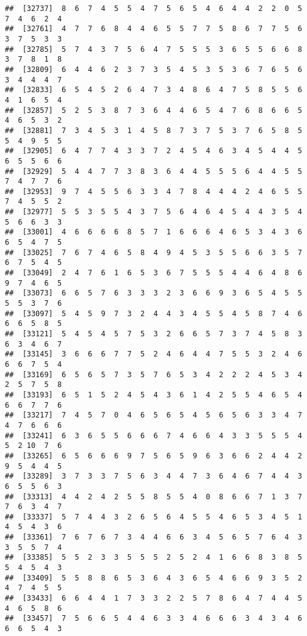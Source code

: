 \documentclass[
]{book}
\begin{document}
\begin{verbatim}
##  [32737]  8  6  7  4  5  5  4  7  5  6  5  4  6  4  4  2  2  0  5  7  4  6  2  4
##  [32761]  4  7  7  6  8  4  4  6  5  5  7  7  5  8  6  7  7  5  6  3  7  5  3  3
##  [32785]  5  7  4  3  7  5  6  4  7  5  5  5  3  6  5  5  6  6  8  3  7  8  1  8
##  [32809]  6  4  4  6  2  3  7  3  5  4  5  3  5  3  6  7  6  5  6  3  4  4  4  7
##  [32833]  6  5  4  5  2  6  4  7  3  4  8  6  4  7  5  8  5  5  6  4  1  6  5  4
##  [32857]  5  2  5  3  8  7  3  6  4  4  6  5  4  7  6  8  6  6  5  4  6  5  3  2
##  [32881]  7  3  4  5  3  1  4  5  8  7  3  7  5  3  7  6  5  8  5  5  4  9  5  5
##  [32905]  6  4  7  7  4  3  3  7  2  4  5  4  6  3  4  5  4  4  5  6  5  5  6  6
##  [32929]  5  4  4  7  7  3  8  3  6  4  4  5  5  5  6  4  4  5  5  7  4  7  7  6
##  [32953]  9  7  4  5  5  6  3  3  4  7  8  4  4  4  2  4  6  5  5  7  4  5  5  2
##  [32977]  5  5  3  5  5  4  3  7  5  6  4  6  4  5  4  4  3  5  4  5  6  6  3  3
##  [33001]  4  6  6  6  6  8  5  7  1  6  6  6  4  6  5  3  4  3  6  6  5  4  7  5
##  [33025]  7  6  7  4  6  5  8  4  9  4  5  3  5  5  6  6  3  5  7  6  7  5  4  5
##  [33049]  2  4  7  6  1  6  5  3  6  7  5  5  5  4  4  6  4  8  6  9  7  4  6  5
##  [33073]  6  6  5  7  6  3  3  3  2  3  6  6  9  3  6  5  4  5  5  5  5  3  7  6
##  [33097]  5  4  5  9  7  3  2  4  4  3  4  5  5  4  5  8  7  4  6  6  6  5  8  5
##  [33121]  5  4  5  4  5  7  5  3  2  6  6  5  7  3  7  4  5  8  3  6  3  4  6  7
##  [33145]  3  6  6  6  7  7  5  2  4  6  4  4  7  5  5  3  2  4  6  6  6  7  5  4
##  [33169]  6  5  6  5  7  3  5  7  6  5  3  4  2  2  2  4  5  3  4  2  5  7  5  8
##  [33193]  6  5  1  5  2  4  5  4  3  6  1  4  2  5  5  4  6  5  4  6  6  7  7  6
##  [33217]  7  4  5  7  0  4  6  5  6  5  4  5  6  5  6  3  3  4  7  4  7  6  6  6
##  [33241]  6  3  6  5  5  6  6  6  7  4  6  6  4  3  3  5  5  5  4  5  2 10  7  6
##  [33265]  6  5  6  6  6  9  7  5  6  5  9  6  3  6  6  2  4  4  2  9  5  4  4  5
##  [33289]  3  7  3  3  7  5  6  3  4  4  7  3  6  4  6  7  4  4  3  6  5  5  6  3
##  [33313]  4  4  2  4  2  5  5  8  5  5  4  0  8  6  6  7  1  3  7  7  6  3  4  7
##  [33337]  5  7  4  4  3  2  6  5  6  4  5  5  4  6  5  3  4  5  1  4  5  4  3  6
##  [33361]  7  6  7  6  7  3  4  4  6  6  3  4  5  6  5  7  6  4  3  3  5  5  7  4
##  [33385]  5  5  2  3  3  5  5  5  2  5  2  4  1  6  6  8  3  8  5  5  4  5  4  3
##  [33409]  5  5  8  8  6  5  3  6  4  3  6  5  4  6  6  9  3  5  2  4  7  4  5  5
##  [33433]  6  6  4  4  1  7  3  3  2  2  5  7  8  6  4  7  4  4  5  4  6  5  8  6
##  [33457]  7  5  6  6  5  4  4  6  3  3  4  6  6  6  3  4  3  4  6  6  6  5  4  3

\end{verbatim}
\end{document}
